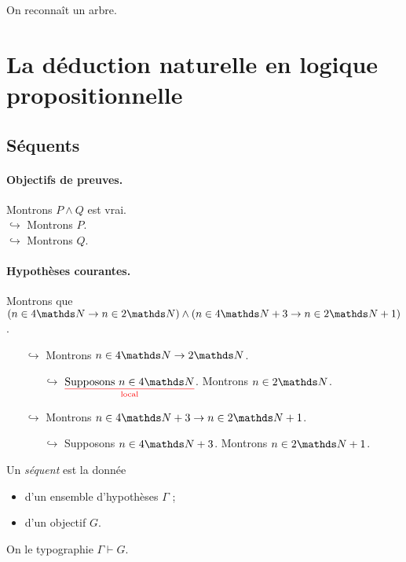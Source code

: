 On reconnaît un arbre.

\section{La déduction naturelle en logique propositionnelle}
\subsection{Séquents}

\paragraph{Objectifs de preuves.}

\begin{exm}
	Montrons $P \land Q$\/ est vrai.\\
	$\hookrightarrow$ Montrons $P$. \\
	$\hookrightarrow$ Montrons $Q$. \\
\end{exm}

\paragraph{Hypothèses courantes.}

\begin{exm}
	Montrons que $(n \in 4\N \to n \in 2\N) \land (n \in 4\N + 3 \to n \in 2\N + 1)$.\\
	\begin{itemize}
		\item[$\hookrightarrow$] Montrons $n \in 4\N \to 2\N$.
			\begin{itemize}
				\item[$\hookrightarrow$] $\underset{\text{\color{red} local}}{\text{\color{red}\underline{\color{black}Supposons $n \in 4 \N$}}}$. Montrons $n \in 2\N$.
			\end{itemize}
		\item[$\hookrightarrow$] Montrons $n \in 4\N + 3 \to  n \in 2\N + 1$.
		\begin{itemize}
			\item[$\hookrightarrow$] Supposons $n \in 4\N + 3$. Montrons $n \in 2\N+1$.
		\end{itemize}
	\end{itemize}
\end{exm}

\begin{defn}[Séquent]
	Un \textit{séquent} est la donnée 
	\begin{itemize}
		\item d'un ensemble d'hypothèses $\Gamma$\/ ;
		\item d'un objectif $G$.
	\end{itemize}
	On le typographie $\Gamma \vdash G$.

\end{defn}

